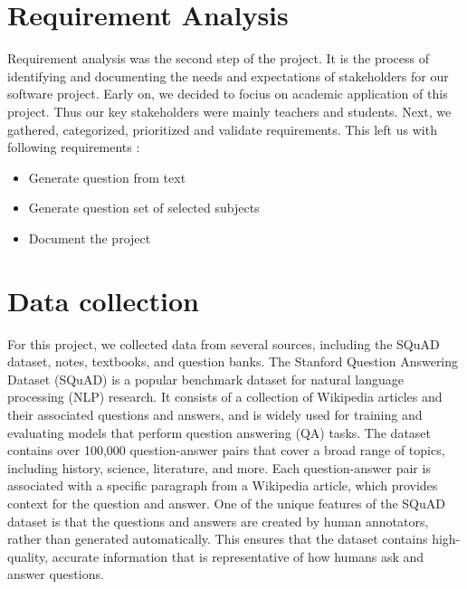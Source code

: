\documentclass[12pt]{report}
\begin{document}
\section{Requirement Analysis}
Requirement analysis was the second step of the project. It is the process of identifying and documenting the needs and expectations of stakeholders for our software project. Early on, we decided to focius on academic application of this project. Thus our key stakeholders were mainly teachers and students. Next, we gathered, categorized, prioritized and validate requirements. This left us with following requirements :
\begin{itemize}
    \item Generate question from text
    \item Generate question set of selected subjects
    \item Document the project
\end{itemize}

\section{Data collection}
For this project, we collected data from several sources, including the SQuAD dataset, notes, textbooks, and question banks. The Stanford Question Answering Dataset (SQuAD) is a popular benchmark dataset for natural language processing (NLP) research. It consists of a collection of Wikipedia articles and their associated questions and answers, and is widely used for training and evaluating models that perform question answering (QA) tasks. The dataset contains over 100,000 question-answer pairs that cover a broad range of topics, including history, science, literature, and more. Each question-answer pair is associated with a specific paragraph from a Wikipedia article, which provides context for the question and answer. One of the unique features of the SQuAD dataset is that the questions and answers are created by human annotators, rather than generated automatically. This ensures that the dataset contains high-quality, accurate information that is representative of how humans ask and answer questions.
\end{document}
